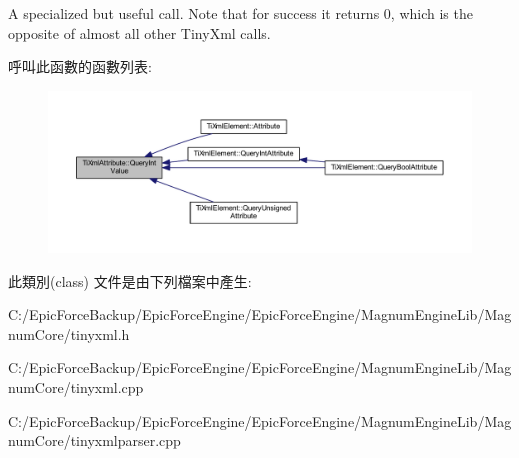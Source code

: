 A specialized but useful call. Note that for success it returns 0, which is the opposite of almost all other Tiny\+Xml calls. 

呼叫此函數的函數列表\+:\nopagebreak
\begin{figure}[H]
\begin{center}
\leavevmode
\includegraphics[width=350pt]{class_ti_xml_attribute_ad6c93088ee21af41a107931223339344_icgraph}
\end{center}
\end{figure}




此類別(class) 文件是由下列檔案中產生\+:\begin{DoxyCompactItemize}
\item 
C\+:/\+Epic\+Force\+Backup/\+Epic\+Force\+Engine/\+Epic\+Force\+Engine/\+Magnum\+Engine\+Lib/\+Magnum\+Core/tinyxml.\+h\item 
C\+:/\+Epic\+Force\+Backup/\+Epic\+Force\+Engine/\+Epic\+Force\+Engine/\+Magnum\+Engine\+Lib/\+Magnum\+Core/tinyxml.\+cpp\item 
C\+:/\+Epic\+Force\+Backup/\+Epic\+Force\+Engine/\+Epic\+Force\+Engine/\+Magnum\+Engine\+Lib/\+Magnum\+Core/tinyxmlparser.\+cpp\end{DoxyCompactItemize}
